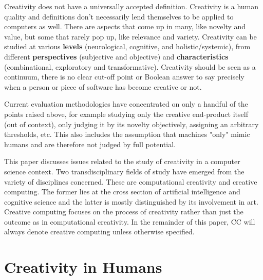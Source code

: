 Creativity does not have a universally accepted definition. Creativity is a human quality and definitions don’t necessarily lend themselves to be applied to computers as well. There are aspects that come up in many, like novelty and value, but some that rarely pop up, like relevance and variety. Creativity can be studied at various \textbf{levels} (neurological, cognitive, and holistic/systemic), from different \textbf{perspectives} (subjective and objective) and \textbf{characteristics} (combinational, exploratory and transformative). Creativity should be seen as a continuum, there is no clear cut-off point or Boolean answer to say precisely when a person or piece of software has become creative or not.

Current evaluation methodologies have concentrated on only a handful of the points raised above, for example studying only the creative end-product itself (out of context), only judging it by its novelty objectively, assigning an arbitrary thresholds, etc. This also includes the assumption that machines "only" mimic humans and are therefore not judged by full potential.

This paper discusses issues related to the study of creativity in a computer science context. Two transdisciplinary fields of study have emerged from the variety of disciplines concerned. These are computational creativity and creative computing. The former lies at the cross section of artificial intelligence and cognitive science and the latter is mostly distinguished by its involvement in art. Creative computing focuses on the process of creativity rather than just the outcome as in computational creativity. In the remainder of this paper, CC will always denote creative computing unless otherwise specified.



\section{Creativity in Humans}

